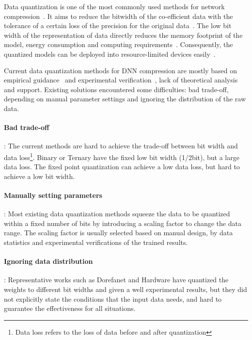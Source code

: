 Data quantization is one of the most commonly used methods for network compression~\cite{han2015deep}. 
It aims to reduce the bitwidth of the co-efficient data with the tolerance of a certain loss of the precision for the original data~\citep{zhou2016dorefa,hubara2016binarized,han2015deep}.
The low bit width of the representation of data directly reduces the memory footprint of the model, energy consumption and computing requirements~\cite{gysel2016hardware,rastegari2016xnor}.
Consequently, the quantized models can be deployed into resource-limited devices easily~\citep{zhou2016dorefa,ghasemzadeh2018rebnet}.

Current data quantization methods for DNN compression are mostly based on empirical guidance~\cite{} and experimental verification~\cite{}, lack of theoretical analysis and support.
Existing solutions encountered some difficulties: bad trade-off, depending on manual parameter settings and ignoring the distribution of the raw data.
\paragraph{Bad trade-off}: 
The current methods are hard to achieve the trade-off between bit width and data loss\footnote{Data loss refers to the loss of data before and after quantization}. Binary \citep{hubara2016binarized} or Ternary \citep{TWNs} have the fixed low bit width (1/2bit), but a large data loss. The fixed point quantization \citep{gysel2016hardware} can achieve a low data loss, but hard to achieve a low bit width.
\paragraph{Manually setting parameters}: 
Most existing data quantization methods squeeze the data to be quantized within a fixed number of bits by introducing a scaling factor to change the data range. The scaling factor is usually selected based on manual design, by data statistics and experimental verifications of the trained results. 
\paragraph{Ignoring data distribution}: 
Representative works such as Dorefanet \citep{zhou2016dorefa} and Hardware \citep{gysel2016hardware} have quantized the weights to different bit widths and given a well experimental results, but they did not explicitly state the conditions that the input data needs, and hard to guarantee the effectiveness for all situations. 

